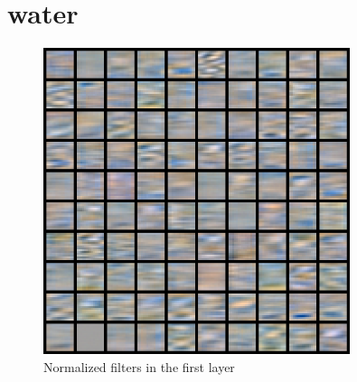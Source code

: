 \documentclass[11pt, oneside]{article}   	%
\begin{document}
\section{water}
\begin{figure}[H]
	\centering
	\includegraphics[width=0.8\textwidth]{water}
	\caption{Normalized filters in the first layer}
	\label {fig:waterf}
\end{figure}
\end{document}
